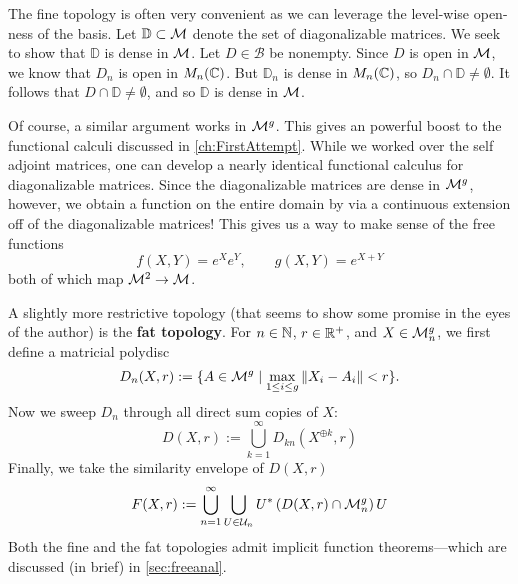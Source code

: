 \begin{example}%
\label{ex:context}
  The fine topology is often very convenient as we can leverage the level-wise
  open-ness of the basis. Let \(\mathbb{D} \subset \mathcal{M} \) denote the set of
  diagonalizable matrices. We seek to show that \(\mathbb{D}\) is dense in
  \(\mathcal{M}\). Let \(D \in \mathcal{B}\) be nonempty. Since \(D\) is open in
  \(\mathcal{M}\), we know that \(D_n\) is open in \(M_n(\mathbb{C})\). But \(\mathbb{D}_n\) is
  dense in \(M_n(\mathbb{C})\), so \(D_n \cap \mathbb{D} \neq \emptyset\). It follows
  that \(D \cap \mathbb{D} \neq \emptyset\), and so \(\mathbb{D}\) is dense in
  \(\mathcal{M}\).

  Of course, a similar argument works in \(\mathcal{M}^{g} \). This gives an powerful
  boost to the functional calculi discussed in \cref{ch:FirstAttempt}. While we
  worked over the self adjoint matrices, one can develop a nearly identical
  functional calculus for diagonalizable matrices. Since the diagonalizable
  matrices are dense in \(\mathcal{M}^{g} \), however, we obtain a function on the
  entire domain by via a continuous extension off of the diagonalizable
  matrices! This gives us a way to make sense of the free functions
  \[
    f(X,Y)=e^Xe^Y, \qquad g(X,Y)=e^{X+Y}
  \]
  both of which map \(\mathcal{M}^{2} \to \mathcal{M}\).
\end{example}

A slightly more restrictive topology (that seems to show some promise in the eyes
of the author) is the \textbf{fat topology}. For \(n \in \mathbb{N} \),
\(r \in \mathbb{R} ^+\), and \(X \in \mathcal{M}^g_n\), we first define a matricial polydisc
\[
  D_n(X,r) := \{A \in \mathcal{M}^g \mid \max_{1\leq i\leq g} \| X_i-A_i \| <r\}.
\]
Now we sweep \(D_n\) through all direct sum copies of \(X\):
\[
  D(X,r) := \bigcup_{k=1}^\infty D_{kn} (X^{\oplus k},r)
\]
Finally, we take the similarity envelope of \(D(X,r)\)
\[
  F(X,r) :=  \bigcup_{n=1}^\infty \bigcup_{U \in \mathcal{U}_n} U^* \left( D(X,r) \cap \mathcal{M}^g_n \right) U
\]
Both the fine and the fat topologies admit implicit function theorems---which
are discussed (in brief) in \cref{sec:freeanal}.

